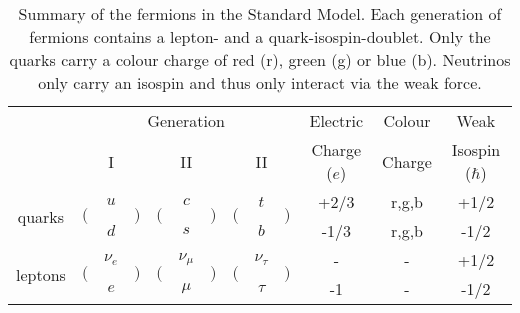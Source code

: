 \begin{table}[]
	\centering
	\caption[Summary of the fermions in the Standard Model]{Summary of the fermions in the Standard Model. Each generation of fermions contains a lepton- and a quark-isospin-doublet. Only the quarks carry a colour charge of red (r), green (g) or blue (b). Neutrinos only carry an isospin and thus only interact via the weak force.}
	\label{tab:theo:fermions}
	\resizebox{\columnwidth}{!}
	{%
	\begin{tabular}{crclrclrclccc}
	\hline
	& \multicolumn{9}{c}{Generation} & Electric & Colour &  Weak \\
	& \multicolumn{3}{c}{I} & \multicolumn{3}{c}{II} & \multicolumn{3}{c}{II} & Charge ($e$) & Charge &  Isospin ($\hbar$) \\
	\hline
	\multirow{2}{*}{quarks} & \multirow{2}{*}{$\Big($} & $u$ & \multirow{2}{*}{$\Big)$} & \multirow{2}{*}{$\Big($} & $c$ & \multirow{2}{*}{$\Big)$} & \multirow{2}{*}{$\Big($} & $t$ & \multirow{2}{*}{$\Big)$} & +2/3 & r,g,b & +1/2 \\  
	 & & $d$ & & & $s$ & & & $b$ & & -1/3 & r,g,b & -1/2 \\ 
	\multirow{2}{*}{leptons}& \multirow{2}{*}{$\Big($} & $\nu_e$ & \multirow{2}{*}{$\Big)$} & \multirow{2}{*}{$\Big($} & $\nu_\mu$ & \multirow{2}{*}{$\Big)$} & \multirow{2}{*}{$\Big($} & $\nu_\tau$ & \multirow{2}{*}{$\Big)$} & - & - & +1/2 \\ 
	 & & $e$ & & & $\mu$ & & & $\tau$ & & -1 & - & -1/2 \\
	\hline
	\end{tabular}
	}
\end{table}


